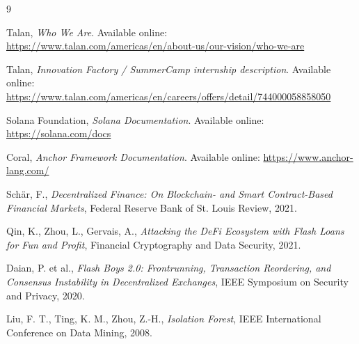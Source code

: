 \documentclass[12pt,a4paper]{report}
\begin{document}
\begin{thebibliography}{9}

Talan, \textit{Who We Are}. Available online: \url{https://www.talan.com/americas/en/about-us/our-vision/who-we-are}

Talan, \textit{Innovation Factory / SummerCamp internship description}. Available online: \url{https://www.talan.com/americas/en/careers/offers/detail/744000058858050}

Solana Foundation, \textit{Solana Documentation}. Available online: \url{https://solana.com/docs}

Coral, \textit{Anchor Framework Documentation}. Available online: \url{https://www.anchor-lang.com/}

Schär, F., \textit{Decentralized Finance: On Blockchain- and Smart Contract-Based Financial Markets}, Federal Reserve Bank of St. Louis Review, 2021.

Qin, K., Zhou, L., Gervais, A., \textit{Attacking the DeFi Ecosystem with Flash Loans for Fun and Profit}, Financial Cryptography and Data Security, 2021.

Daian, P. et al., \textit{Flash Boys 2.0: Frontrunning, Transaction Reordering, and Consensus Instability in Decentralized Exchanges}, IEEE Symposium on Security and Privacy, 2020.

Liu, F. T., Ting, K. M., Zhou, Z.-H., \textit{Isolation Forest}, IEEE International Conference on Data Mining, 2008.

\end{thebibliography}
\end{document}
